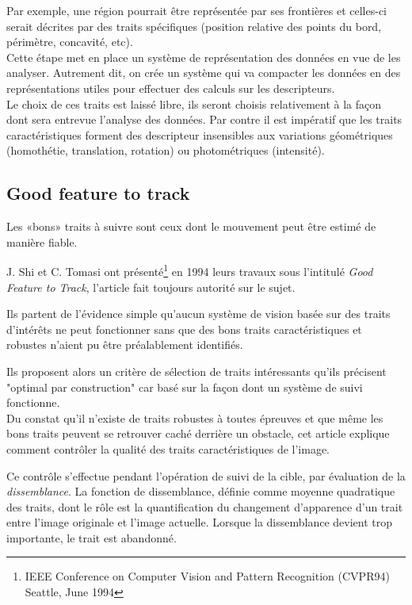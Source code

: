 \documentclass[a4paper,12pt]{report}
\begin{document}
Par exemple, une région pourrait être représentée par ses frontières et celles-ci serait décrites par des traits spécifiques (position relative des points du bord, périmètre, concavité, etc).
\\

Cette étape met en place un système de représentation des données en vue de les analyser. Autrement dit, on crée un système qui va compacter les données en des représentations utiles pour effectuer des calculs sur les descripteurs.\\

Le choix de ces traits est laissé libre, ils seront choisis relativement à la façon dont sera entrevue l'analyse des données. Par contre il est impératif que les traits caractéristiques forment des descripteur insensibles aux variations géométriques (homothétie, translation, rotation) ou photométriques (intensité).   
\subsection{Good feature to track}
Les «bons» traits à suivre sont ceux dont le mouvement peut être estimé de manière fiable.

J. Shi et C. Tomasi ont présenté\footnote{IEEE Conference on Computer Vision and Pattern Recognition (CVPR94) Seattle, June 1994} en 1994 leurs travaux sous l'intitulé \textit{Good Feature to Track}, l'article fait toujours autorité sur le sujet. 

Ils partent de l'évidence simple qu'aucun système de vision basée sur des traits d'intérêts ne peut fonctionner sans que des bons traits caractéristiques et robustes n'aient pu être préalablement identifiés. 

Ils proposent alors un critère de sélection de traits intéressants qu'ils précisent "optimal par construction" car basé sur la façon dont un système de suivi fonctionne.\\

Du constat qu'il n'existe de traits robustes à toutes épreuves et que même les bons traits peuvent se retrouver caché derrière un obstacle, cet article explique comment contrôler la qualité des traits caractéristiques de l'image.

Ce contrôle s'effectue pendant l'opération de suivi de la cible, par évaluation de la \textit{dissemblance}. La fonction de dissemblance, définie comme moyenne quadratique des traits, dont le rôle est la quantification du changement d'apparence d'un trait entre l'image originale et l'image actuelle. Lorsque la dissemblance devient trop importante, le trait est abandonné.
\end{document}
